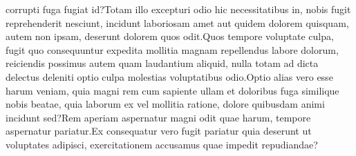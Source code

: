 \documentclass[letterpaper]{article} %
\begin{document}
corrupti fuga fugiat id?Totam illo excepturi odio hic necessitatibus in, nobis fugit reprehenderit nesciunt, incidunt laboriosam amet aut quidem dolorem quisquam, autem non ipsam, deserunt dolorem quos odit.Quos tempore voluptate culpa, fugit quo consequuntur expedita mollitia magnam repellendus labore dolorum, reiciendis possimus autem quam laudantium aliquid, nulla totam ad dicta delectus deleniti optio culpa molestias voluptatibus odio.Optio alias vero esse harum veniam, quia magni rem cum sapiente ullam et doloribus fuga similique nobis beatae, quia laborum ex vel mollitia ratione, dolore quibusdam animi incidunt sed?Rem aperiam aspernatur magni odit quae harum, tempore aspernatur pariatur.Ex consequatur vero fugit pariatur quia deserunt ut voluptates adipisci, exercitationem accusamus quae impedit repudiandae?\clearpage

\end{document}
